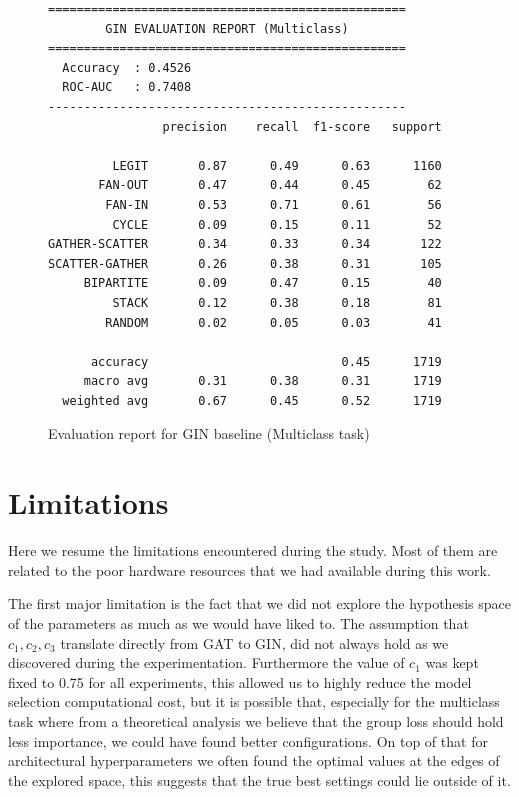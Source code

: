 \begin{figure}
  \centering
  \begin{minipage}{0.65\textwidth}
\footnotesize
\begin{verbatim}
==================================================
        GIN EVALUATION REPORT (Multiclass)
==================================================
  Accuracy  : 0.4526
  ROC-AUC   : 0.7408
--------------------------------------------------
                precision    recall  f1-score   support

         LEGIT       0.87      0.49      0.63      1160
       FAN-OUT       0.47      0.44      0.45        62
        FAN-IN       0.53      0.71      0.61        56
         CYCLE       0.09      0.15      0.11        52
GATHER-SCATTER       0.34      0.33      0.34       122
SCATTER-GATHER       0.26      0.38      0.31       105
     BIPARTITE       0.09      0.47      0.15        40
         STACK       0.12      0.38      0.18        81
        RANDOM       0.02      0.05      0.03        41

      accuracy                           0.45      1719
     macro avg       0.31      0.38      0.31      1719
  weighted avg       0.67      0.45      0.52      1719
\end{verbatim}
  \end{minipage}
  \caption{Evaluation report for GIN baseline (Multiclass task)}
  \label{fig:eval_baseline_gin_multi}
\end{figure}

\section{Limitations}
\label{Limitations}

Here we resume the limitations encountered during the study. Most of them are related to the poor hardware resources that we had available during this work.

The first major limitation is the fact that we did not explore the hypothesis space of the parameters as much as we would have liked to. The assumption that $c_1,c_2,c_3$ translate directly from GAT to GIN, did not always hold as we discovered during the experimentation. Furthermore the value of \(c_1\) was kept fixed to 0.75 for all experiments, this allowed us to highly reduce the model selection computational cost, but it is possible that, especially for the multiclass task where from a theoretical analysis we believe that the group loss should hold less importance, we could have found better configurations. On top of that for architectural hyperparameters we often found the optimal values at the edges of the explored space, this suggests that the true best settings could lie outside of it.

